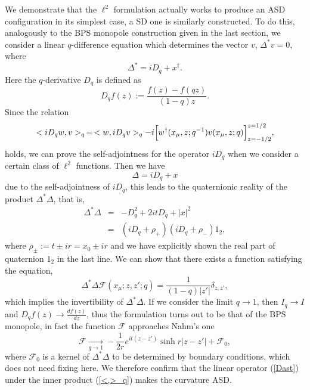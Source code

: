 \documentclass[a4paper,10pt]{article}
\begin{document}
We demonstrate that the $\ell^2$ formulation actually works to produce an ASD configuration in its simplest case, a SD one is similarly constructed.
To do this, analogously to the BPS monopole construction given in the last section, we consider a linear $q$-difference equation which determines the vector $v$,  $\Delta^* v=0$,  where
\begin{equation}
\Delta^*=iD_q+x^\dagger. \label{Dast}
\end{equation}
Here the $q$-derivative $D_q$ is defined as
\begin{equation}
D_qf(z):=\frac{f(z)-f(qz)}{(1-q)z}. %
\end{equation}
Since the relation
\begin{equation}
 <iD_qw,v>_q\,=\,<w,iD_qv>_q-i\Bigl[w^\dagger(x_\mu,z;q^{-1})v(x_\mu,z;q)\Bigr]^{z=1/2}_{z=-1/2}, \label{selfadj}
\end{equation}
holds, we can prove the self-adjointness for the operator $iD_q$ when we consider a certain class of $\ell^2$ functions.
Then we have
\begin{equation}
\Delta=iD_q+x 
\end{equation}
due to the self-adjointness of $iD_q$, this leads to the quaternionic reality of the product $\Delta^*\Delta$, that is,
\begin{eqnarray}
\Delta^*\Delta&=&-D_q^2+2itD_q+|x|^2\nonumber\\
     &=&(iD_q+\rho_{+})(iD_q+\rho_{-})1_2,
\end{eqnarray}
where $\rho_\pm:=t\pm ir=x_0\pm ir$ and we have explicitly shown the real part of quaternion $1_2$ in the last line.
We can show \cite{KN} that there exists a function satisfying the equation,
\begin{equation}
\Delta^*\Delta \mathcal{F}(x_\mu;z,z';q)=\frac{1}{(1-q)|z'|}\delta_{z,z'},
\end{equation}
which implies the invertibility of $\Delta^*\Delta$.
If we consider the limit $q \to 1$, then $I_q \to I$ and $D_qf(z) \to \frac{df(z)}{dz}$, thus the formulation turns out to be that of the BPS monopole, in fact the function $\mathcal{F}$ approaches Nahm's one \cite{Nahm80}
\begin{equation}
\mathcal{F} \xrightarrow [q\to1]{}-\frac{1}{2r}e^{it(z-z')}\sinh r|z-z'|+\mathcal{F}_0,
\end{equation}
where $\mathcal{F}_0$ is a kernel of $\Delta^*\Delta$ to be determined by boundary conditions, which does not need fixing here.
We therefore confirm that the linear operator (\ref{Dast}) under the inner product (\ref{<,>_q}) makes the curvature ASD.
\end{document}
